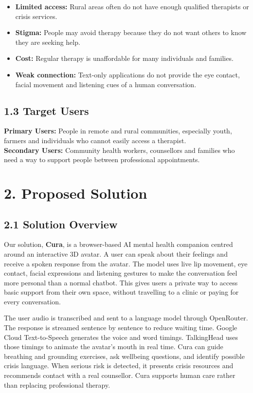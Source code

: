 \documentclass[9pt,a4paper]{article}
\begin{document}
\begin{itemize}
  \item \textbf{Limited access:} Rural areas often do not have enough
        qualified therapists or crisis services.
  \item \textbf{Stigma:} People may avoid therapy because they do not want
        others to know they are seeking help.
  \item \textbf{Cost:} Regular therapy is unaffordable for many individuals and
        families.
  \item \textbf{Weak connection:} Text-only applications do not provide the
        eye contact, facial movement and listening cues of a human conversation.
\end{itemize}

\subsection*{1.3 Target Users}

\textbf{Primary Users:} People in remote and rural communities, especially
youth, farmers and individuals who cannot easily access a therapist.\\
\textbf{Secondary Users:} Community health workers, counsellors and families
who need a way to support people between professional appointments.

\section*{2. Proposed Solution}

\subsection*{2.1 Solution Overview}

Our solution, \textbf{Cura}, is a browser-based AI mental health companion
centred around an interactive 3D avatar. A user can speak about their feelings
and receive a spoken response from the avatar. The model uses live lip movement,
eye contact, facial expressions and listening gestures to make the conversation
feel more personal than a normal chatbot. This gives users a private way to
access basic support from their own space, without travelling to a clinic or
paying for every conversation.

The user audio is transcribed and sent to a language model through OpenRouter.
The response is streamed sentence by sentence to reduce waiting time. Google
Cloud Text-to-Speech generates the voice and word timings. TalkingHead uses
those timings to animate the avatar's mouth in real time. Cura can guide
breathing and grounding exercises, ask wellbeing questions, and identify
possible crisis language. When serious risk is detected, it presents crisis
resources and recommends contact with a real counsellor. Cura supports human
care rather than replacing professional therapy.
\end{document}
